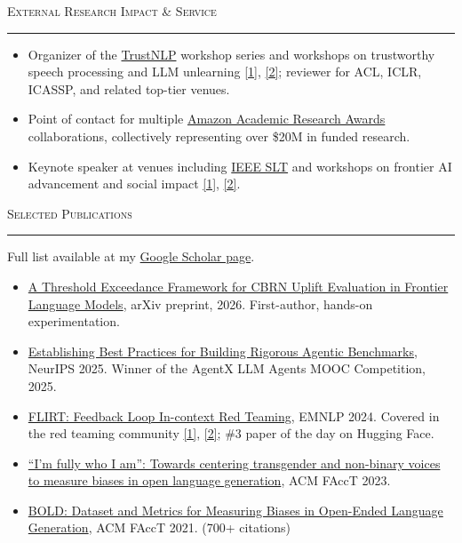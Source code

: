 \documentclass[11pt]{article}
\newcommand{\sectionheading}[1]{%
  \vspace{8pt}%
  {\large\scshape #1}\par\vspace{1pt}\hrule\vspace{3pt}%
}
\begin{document}
\sectionheading{External Research Impact \& Service}
\begin{itemize}
  \item Organizer of the \href{https://trustnlpworkshop.github.io/}{TrustNLP} workshop series and workshops on trustworthy speech processing and LLM unlearning \href{https://trustworthyspeechprocessing.github.io/}{[1]}, \href{https://llmunlearningsemeval2025.github.io/}{[2]}; reviewer for ACL, ICLR, ICASSP, and related top-tier venues.
  \item Point of contact for multiple \href{https://www.amazon.science/research-awards}{Amazon Academic Research Awards} collaborations, collectively representing over \$20M in funded research.
  \item Keynote speaker at venues including \href{https://signalprocessingsociety.org/newsletter/2026/06/bridging-research-and-innovation-ieee-spoken-language-technology-slt-workshop}{IEEE SLT} and workshops on frontier AI advancement and social impact \href{https://advml-frontier.github.io/}{[1]}, \href{https://nlp4social.github.io/NSG-2026/}{[2]}.
\end{itemize}

\newpage

\sectionheading{Selected Publications}
Full list available at my \href{https://scholar.google.com/citations?user=gSTLsFcAAAAJ}{Google Scholar page}.

\begin{itemize}
  \item \href{https://arxiv.org/abs/2607.12200}{A Threshold Exceedance Framework for CBRN Uplift Evaluation in Frontier Language Models}, arXiv preprint, 2026. {\color{gray}First-author, hands-on experimentation.}
  \item \href{https://arxiv.org/abs/2507.02825}{Establishing Best Practices for Building Rigorous Agentic Benchmarks}, NeurIPS 2025. {\color{gray}Winner of the AgentX LLM Agents MOOC Competition, 2025.}
  \item \href{https://arxiv.org/abs/2308.04265}{FLIRT: Feedback Loop In-context Red Teaming}, EMNLP 2024. {\color{gray}Covered in the red teaming community \href{https://lilianweng.github.io/posts/2023-10-25-adv-attack-llm/}{[1]}, \href{https://huggingface.co/papers/2308.04265}{[2]}; \#3 paper of the day on Hugging Face.}
  \item \href{https://arxiv.org/abs/2305.09941}{``I'm fully who I am'': Towards centering transgender and non-binary voices to measure biases in open language generation}, ACM FAccT 2023.
  \item \href{https://arxiv.org/abs/2101.11718}{BOLD: Dataset and Metrics for Measuring Biases in Open-Ended Language Generation}, ACM FAccT 2021. {\color{gray}(700+ citations)}
\end{itemize}
\end{document}
